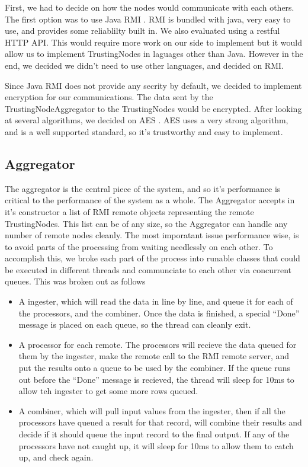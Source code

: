 \documentclass[11pt]{article}
\begin{document}
First, we had to decide on how the nodes would communicate with each others. The first option was to use Java RMI \cite{rmi}. RMI is bundled with java, very easy to use, and provides some reliablilty built in. We also evaluated using a restful HTTP API. This would require more work on our side to implement but it would allow us to implement TrustingNodes in laguages other than Java. However in the end, we decided we didn't need to use other languages, and decided on RMI.

Since Java RMI does not provide any secrity by default, we decided to implement encryption for our communications. The data sent by the TrustingNodeAggregator to the TrustingNodes would be encrypted. After looking at several algorithms, we decided on AES \cite{aes}. AES uses a very strong algorithm, and is a well supported standard, so it's trustworthy and easy to implement.

\subsection{Aggregator}

The aggregator is the central piece of the system, and so it's performance is critical to the performance of the system as a whole. The Aggregator accepts in it's constructor a list of RMI remote objects representing the remote TrustingNodes. This list can be of any size, so the Aggregator can handle any number of remote nodes cleanly. The most imporatant issue performance wise, is to avoid parts of the processing from waiting needlessly on each other. To accomplish this, we broke each part of the process into runable classes that could be executed in different threads and communciate to each other via concurrent queues. This was broken out as follows

\begin{itemize}
\item A ingester, which will read the data in line by line, and queue it for each of the processors, and the combiner. Once the data is finished, a special ``Done'' message is placed on each queue, so the thread can cleanly exit.
\item A processor for each remote. The processors will recieve the data queued for them by the ingester, make the remote call to the RMI remote server, and put the results onto a queue to be used by the combiner. If the queue runs out before the ``Done'' message is recieved, the thread will sleep for 10ms to allow teh ingester to get some more rows queued.
\item A combiner, which will pull input values from the ingester, then if all the processors have queued a result for that record, will combine their results and decide if it should queue the input record to the final output. If any of the processors have not caught up, it will sleep for 10ms to allow them to catch up, and check again.
\end{itemize}
\end{document}

